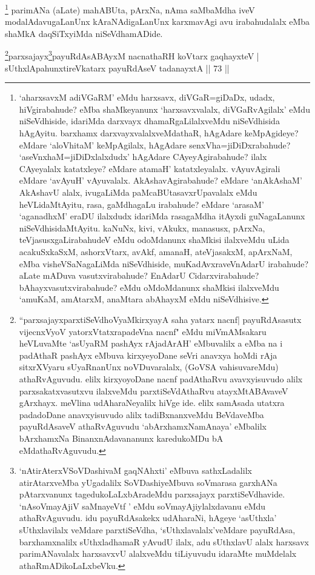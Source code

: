 \begin{artha}
\footnote{`aharxsavxM adiVGaRM' eMdu harxsavx, diVGaR=giDaDx, udadx, hiVgirabahude? eMba shaMkeyanunx `harxsavxvalalx, diVGaRvAgilalx' eMdu niSeVdhiside, idariMda darxvayx dhamaRgaLilalxveMdu niSeVdhisida hAgAyitu. barxhamx darxvayxvalalxveMdathaR, hAgAdare keMpAgideye? eMdare `aloVhitaM' keMpAgilalx, hAgAdare senxVha=jiDiDxrabahude? `aseVnxhaM=jiDiDxlalxdudx' hAgAdare CAyeyAgirabahude? ilalx CAyeyalalx katatxleye? eMdare atamaH' katatxleyalalx. vAyuvAgirali eMdare `avAyuH' vAyuvalalx. AkAshavAgirabahude? eMdare `anAkAshaM' AkAshavU alalx, ivugaLiMda paMcaBUtasavxrUpavalalx eMdu heVLidaMtAyitu, rasa, gaMdhagaLu irabahude? eMdare `arasaM' `aganadhxM' eraDU ilalxdudx idariMda rasagaMdha itAyxdi guNagaLanunx niSeVdhisidaMtAyitu. kaNuNx, kivi, vAkukx, manasusx, pArxNa, teVjasusxgaLirabahudeV eMdu odoMdanunx shaMkisi ilalxveMdu uLida acakuSxkaSxM, ashorxVtarx, avAkf, amanaH, ateVjasakxM, apArxNaM, eMba visheVSaNagaLiMda niSeVdhiside, muKadAvxraveVnAdarU irabahude? aLate mADuva vasutxvirabahude? EnAdarU Cidarxvirabahude? bAhayxvasutxvirabahude? eMdu oMdoMdanunx shaMkisi ilalxveMdu `amuKaM, amAtarxM, anaMtara abAhayxM eMdu niSeVdhisive.} parimANa (aLate) mahABUta, pArxNa, nAma saMbaMdha iveV modalAdavugaLanUnx kAraNAdigaLanUnx karxmavAgi avu irabahudalalx eMba shaMkA daqSiTxyiMda niSeVdhamADide.
\end{artha}



 
\begin{shl}
\footnote{``parxsajayxparxtiSeVdhoV\s yaMkirxyayA saha yatarx nacnf| payuRdAsasutx vijecnxVyoV yatorxVtatxrapadeVna nacnf" eMdu miVmAMsakaru heVLuvaMte `asUyaRM pashAyx rAjadArAH' eMbuvalilx a eMba na i padAthaR pashAyx eMbuva kirxyeyoDane seVri anavxya hoMdi rAja sitxrXVyaru sUyaRnanUnx noVDuvaralalx, (GoVSA vahisuvareMdu) athaRvAguvudu. elilx kirxyoyoDane nacnf padAthaRvu avavxyisuvudo alilx parxsakatxvasutxvu ilalxveMdu parxtiSeVdAthaRvu atayxMtABAvaveV gArxhayx. meVlina udAharaNeyalilx hiVge ide. elilx samAsada utatxra padadoDane anavxyisuvudo alilx tadiBxnanxveMdu BeVdaveMba payuRdAsaveV athaRvAguvudu `abArxhamxNamAnaya' eMbalilx bArxhamxNa BinanxnAdavananunx karedukoMDu bA eMdathaRvAguvudu.}parxsajayx\footnote{`nAtirAterxVSoVDashivaM gaqNAhxti' eMbuva sathxLadalilx atirAtarxveMba yUgadalilx SoVDashiyeMbuva soVmarasa garxhANa pAtarxvanunx tagedukoLaLxbAradeMdu parxsajayx parxtiSeVdhavide. `nAsoVmayAjiV saMnayeVtf ' eMdu soVmayAjiylalxdavanu eMdu athaRvAguvudu. idu payuRdAsakekx udAharaNi, hAgeye `asUthxla' sUthxlavilalx veMdare parxtiSeVdha, `sUthxlavalalx'veMdare payuRdAsa, barxhamxnalilx sUthxladhamaR yAvudU ilalx, adu sUthxlavU alalx harxsavx parimANavalalx harxsavxvU alalxveMdu tiLiyuvudu idaraMte muMdelalx athaRmADikoLaLxbeVku.}payuRdAsABAyxM nacnathaRH koV\s tarx gaqhayxteV |\\
sUthxlApahunxtireVkatarx payuRdAseV tadanayxtA \hfill || 73 ||
\end{shl}

